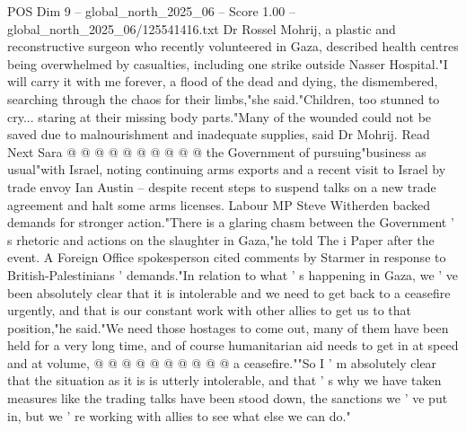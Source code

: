 \begin{textsample}{POS Dim 9 – global\_north\_2025\_06 – Score 1.00 – global\_north\_2025\_06/125541416.txt}
Dr Rossel Mohrij, a plastic and reconstructive surgeon who recently volunteered in Gaza, described health centres being overwhelmed by casualties, including one strike outside Nasser Hospital."I will carry it with me forever, a flood of the dead and dying, the dismembered, searching through the chaos for their limbs,"she said."Children, too stunned to cry... staring at their missing body parts."Many of the wounded could not be saved due to malnourishment and inadequate supplies, said Dr Mohrij.
Read Next Sara @ @ @ @ @ @ @ @ @ @ the Government of pursuing"business as usual"with Israel, noting continuing arms exports and a recent visit to Israel by trade envoy Ian Austin -- despite recent steps to suspend talks on a new trade agreement and halt some arms licenses.
Labour MP Steve Witherden backed demands for stronger action."There is a glaring chasm between the Government ' s rhetoric and actions on the slaughter in Gaza,"he told The i Paper after the event.
A Foreign Office spokesperson cited comments by Starmer in response to British-Palestinians ' demands."In relation to what ' s happening in Gaza, we ' ve been absolutely clear that it is intolerable and we need to get back to a ceasefire urgently, and that is our constant work with other allies to get us to that position,"he said."We need those hostages to come out, many of them have been held for a very long time, and of course humanitarian aid needs to get in at speed and at volume, @ @ @ @ @ @ @ @ @ @ a ceasefire.""So I ' m absolutely clear that the situation as it is is utterly intolerable, and that ' s why we have taken measures like the trading talks have been stood down, the sanctions we ' ve put in, but we ' re working with allies to see what else we can do."

\end{textsample}

